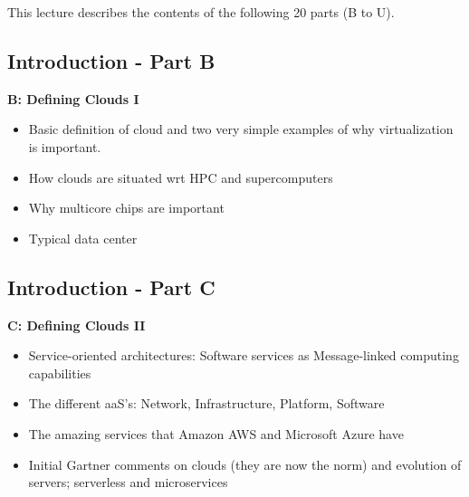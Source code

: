 
This lecture describes the contents of the following 20 parts (B to U).

\subsection{Introduction - Part B}\label{s:cloud-fundamentals-b}


\textbf{B: Defining Clouds I}
\begin{itemize}
\item Basic definition of cloud and two very simple examples of why virtualization is important. 
\item How clouds are situated wrt HPC and supercomputers
\item Why multicore chips are important
\item Typical data center
\end{itemize}

\subsection{Introduction - Part C}\label{s:cloud-fundamentals-c}



\textbf{C: Defining Clouds II}
\begin{itemize}
\item Service-oriented architectures: Software services as Message-linked computing capabilities
\item The different aaS’s: Network, Infrastructure, Platform, Software
\item The amazing services that Amazon AWS and Microsoft Azure have
\item Initial Gartner comments on clouds (they are now the norm) and evolution of servers; serverless and microservices

\end{itemize}

